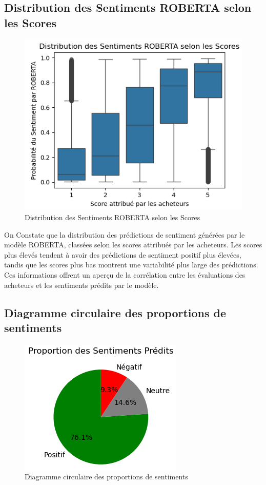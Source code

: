 \subsection{Distribution des Sentiments ROBERTA selon les Scores}
\begin{figure}[h]
    \centering
    \includegraphics[scale=0.7]{assets/sentimentrobertasurscore.PNG}
    \caption{Distribution des Sentiments ROBERTA selon les Scores}
    \label{fig:robertaSentimentssurscore}
\end{figure}
On Constate que la distribution des prédictions de sentiment générées par le modèle ROBERTA, classées selon les scores attribués par les acheteurs. Les scores plus élevés tendent à avoir des prédictions de sentiment positif plus élevées, tandis que les scores plus bas montrent une variabilité plus large des prédictions. Ces informations offrent un aperçu de la corrélation entre les évaluations des acheteurs et les sentiments prédits par le modèle.



\subsection{Diagramme circulaire des proportions de sentiments}
\begin{figure}[h]
    \centering
    \includegraphics[scale=0.7]{assets/proportiondessentimentspredits.PNG}
    \caption{Diagramme circulaire des proportions de sentiments}
    \label{fig:proportiondessentiments}
\end{figure}

